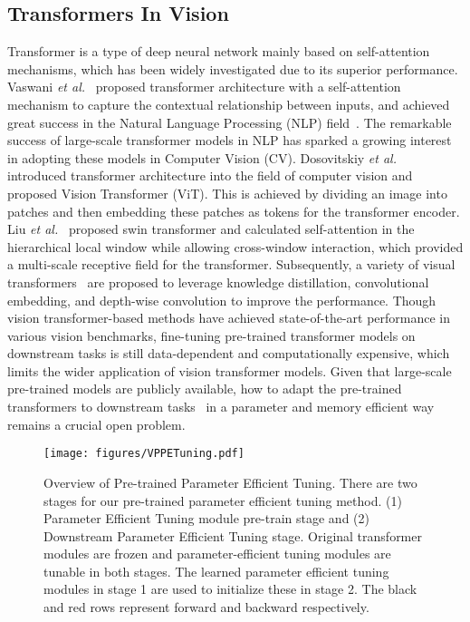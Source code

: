 \documentclass[10pt,journal,letterpaper,compsoc]{IEEEtran}
\begin{document}
\subsection{Transformers In Vision}
Transformer is a type of deep neural network mainly based on self-attention mechanisms, which has been widely investigated due to its superior performance. Vaswani \emph{et al.}~\cite{transformer} proposed transformer architecture with a self-attention mechanism to capture the contextual relationship between inputs, and achieved great success in the Natural Language Processing (NLP) field~\cite{BERT,2020Language,2019Exploring,clip}. The remarkable success of large-scale transformer models in NLP has sparked a growing interest in adopting these models in Computer Vision (CV). Dosovitskiy \emph{et al.}~\cite{vit} introduced transformer architecture into the field of computer vision and proposed Vision Transformer (ViT). This is achieved by dividing an image into patches and then embedding these patches as tokens for the transformer encoder. Liu \emph{et al.}~\cite{swin} proposed swin transformer and calculated self-attention in the hierarchical local window while allowing cross-window interaction, which provided a multi-scale receptive field for the transformer. Subsequently, a variety of visual transformers~\cite{DeiT, CeiT, Localvit} are proposed to leverage knowledge distillation, convolutional embedding, and depth-wise convolution to improve the performance. Though vision transformer-based methods have achieved state-of-the-art performance in various vision benchmarks, fine-tuning pre-trained transformer models on downstream tasks is still data-dependent and computationally expensive, which limits the wider application of vision transformer models. Given that large-scale pre-trained models are publicly available, how to adapt the pre-trained transformers to downstream tasks~\cite{DBLP:conf/coling/HagstromJ22, DBLP:journals/corr/abs-2210-06989} in a parameter and memory efficient way remains a crucial open problem.

\begin{figure*}[t]
    \label{fig:ppetuning}
    \centering   
    \texttt{[image: figures/VPPETuning.pdf]}
    \caption{Overview of Pre-trained Parameter Efficient Tuning. There are two stages for our pre-trained parameter efficient tuning method. (1) Parameter Efficient Tuning module pre-train stage and (2) Downstream Parameter Efficient Tuning stage. Original transformer modules are frozen and parameter-efficient tuning modules are tunable in both stages. The learned parameter efficient tuning modules in stage 1 are used to initialize these in stage 2. The black and red rows represent forward and backward respectively.}
\end{figure*}
\end{document}
